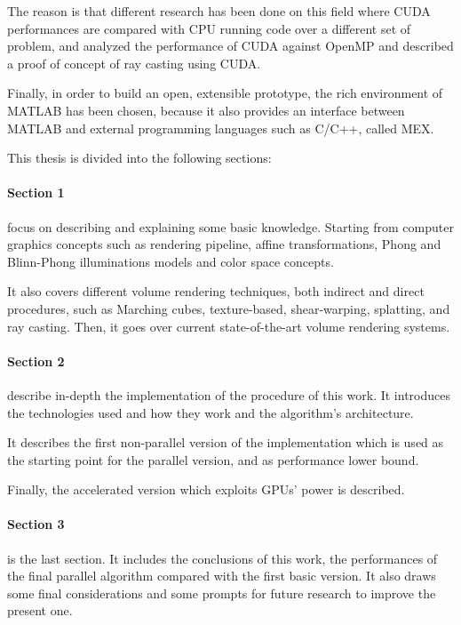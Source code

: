 \documentclass[12pt,a4paper]{extarticle}
\newcommand{\linespace}{\vspace{8pt}}
\begin{document}
The reason is that different research has been done on this field where CUDA performances are compared with CPU running code over a different set of problem, \cite{garland:8}
and \cite{shen:9} analyzed the performance of CUDA against OpenMP and described a proof of concept of ray casting using CUDA.
\linespace

Finally, in order to build an open, extensible prototype, the rich environment of MATLAB has been chosen, because it also provides an interface between MATLAB and external programming languages such as C/C++, called MEX.
\linespace

This thesis is divided into the following sections:
\paragraph{Section 1} focus on describing and explaining some basic knowledge. Starting from computer graphics concepts such as rendering pipeline, affine transformations, Phong and Blinn-Phong illuminations models and color space concepts.

It also covers different volume rendering techniques, both indirect and direct procedures, such as Marching cubes, texture-based, shear-warping, splatting, and ray casting. Then, it goes over current state-of-the-art volume rendering systems. 
 
 \paragraph{Section 2} describe in-depth the implementation of the procedure of this work. It introduces the technologies used and how they work and the algorithm's architecture.
 
It describes the first non-parallel version of the implementation which is used as the starting point for the parallel version, and as performance lower bound.

Finally, the accelerated version which exploits GPUs' power is described.

\paragraph{Section 3} is the last section. It includes the conclusions of this work, the performances of the final parallel algorithm compared with the first basic version. It also draws some final considerations and some prompts for future research to improve the present one.
\pagebreak
\fancyhead[L]{\nouppercase{\leftmark}}
\end{document}

